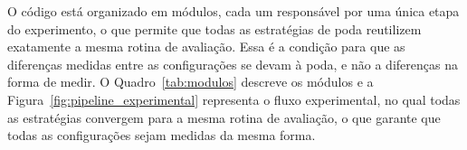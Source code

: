 O código está organizado em módulos, cada um responsável por uma única etapa do
experimento, o que permite que todas as estratégias de poda reutilizem exatamente a mesma
rotina de avaliação. Essa é a condição para que as diferenças medidas entre as
configurações se devam à poda, e não a diferenças na forma de medir. O
Quadro~\ref{tab:modulos} descreve os módulos e a Figura~\ref{fig:pipeline_experimental}
representa o fluxo experimental, no qual todas as estratégias convergem para a mesma rotina
de avaliação, o que garante que todas as configurações sejam medidas da mesma forma.

